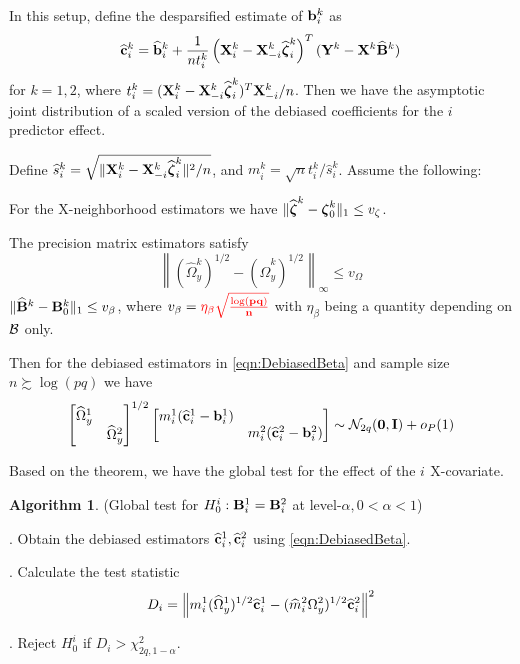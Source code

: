 \documentclass[12pt, letterpaper]{article}
\theoremstyle{definition}
\newtheorem{Algorithm}{Algorithm}
\DeclareMathOperator*{\Th}{^{\text{th}}}
\numberwithin{equation}{section}
\begin{document}
In this setup, define the desparsified estimate of ${\bf{b}}_i^k$ as
%
\begin{align}\label{eqn:DebiasedBeta}
\widehat {{\bf{c}}}_i^k = \widehat {{\bf{b}}}_i^k + \frac{1}{n t_i^k} \left( {\mathbf{X}}_i^k - {\mathbf{X}}_{-i}^k \widehat {{\boldsymbol{\zeta}}}_i^k \right)^T
({\mathbf{Y}}^k - {\mathbf{X}}^k \widehat {{\mathbf{B}}}^k )
\end{align}
%
for $k = 1,2$, where $t_i^k = ( {\mathbf{X}}_i^k - {\mathbf{X}}_{-i}^k \widehat {{\boldsymbol{\zeta}}}_i^k )^T {\mathbf{X}}_{-i}^k/n$. Then we have the asymptotic joint distribution of a scaled version of the debiased coefficients for the $i\Th$ predictor effect.

\begin{Theorem}\label{Thm:ThmTesting}
Define $\widehat s_i^k = \sqrt{\| {\mathbf{X}}_i^k - {\mathbf{X}}_{-i}^k \widehat {{\boldsymbol{\zeta}}}_i^k \|^2/n}$, and $m_i^k = \sqrt n t_i^k / \widehat s_i^k$. Assume the following:

 For the X-neighborhood estimators we have $\| \widehat {{\boldsymbol{\zeta}}}^k - {\boldsymbol{\zeta}}_0^k \|_1 \leq v_\zeta$.

 The precision matrix estimators satisfy
%
$$
\left\| (\widehat \Omega_y^k)^{1/2} - (\widehat \Omega_y^k)^{1/2} \right\|_\infty \leq v_\Omega
$$
%
 $\| \widehat {{\mathbf{B}}}^k - {\mathbf{B}}^k_0 \|_1 \leq v_\beta$, where $v_\beta = { \color{red} \bf \eta_\beta \sqrt{\frac{\log (pq)}{n}}}$ with $\eta_\beta$ being a quantity depending on ${\cal{B}}$ only.

Then for the debiased estimators in \eqref{eqn:DebiasedBeta} and sample size $n \succsim \log (pq)$ we have
%
\begin{align}\label{eqn:ThmTestingEqn}
\begin{bmatrix}
\widehat \Omega_y^1 &\\
& \widehat \Omega_y^2
\end{bmatrix}^{1/2}
%
\begin{bmatrix}
m_i^1 (\widehat \bfc_i^1 - \bfb_i^1) &\\
&  m_i^2 (\widehat \bfc_i^2 - \bfb_i^2)
\end{bmatrix}
\sim \cN_{2q} ({\bf 0}, \bfI) + o_P(1)
\end{align}
%
\end{Theorem}
%

Based on the theorem, we have the global test for the effect of the $i^{\Th}$ X-covariate.

\begin{Algorithm} (Global test for $H_0^i: {\mathbf{B}}_i^1 = {\mathbf{B}}_i^2$ at level-$\alpha, 0< \alpha< 1$)

. Obtain the debiased estimators $\widehat {{\bf{c}}}_i^1, \widehat {{\bf{c}}}_i^2$ using \eqref{eqn:DebiasedBeta}.


. Calculate the test statistic
%
$$
D_i = \left\| m_i^1 (\widehat \Omega_y^1)^{1/2} \widehat {{\bf{c}}}_i^1 - 
 (\widehat m_i^2 \Omega_y^2)^{1/2} \widehat {{\bf{c}}}_i^2 \right\|^2
$$
%

. Reject $H_0^i$ if $D_i > \chi^2_{2q, 1-\alpha}$.
\end{Algorithm}
\end{document}
